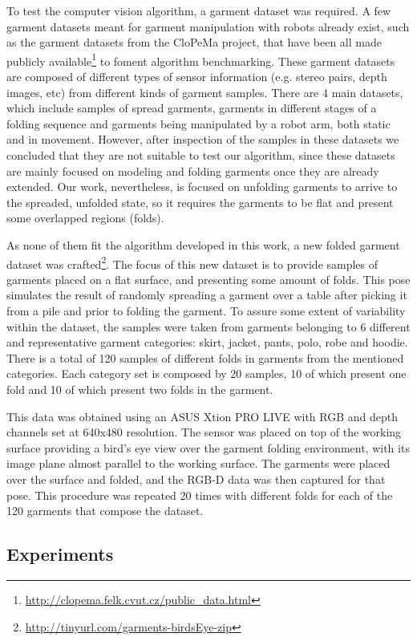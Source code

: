 To test the computer vision algorithm, a garment dataset was required. A few garment datasets meant for garment manipulation with robots already exist, such as the garment datasets from the CloPeMa project, that have been all made publicly available\footnote{\url{http://clopema.felk.cvut.cz/public_data.html}} to foment algorithm benchmarking. These garment datasets are composed of different types of sensor information (e.g. stereo pairs, depth images, etc) from different kinds of garment samples. There are 4 main datasets, which include samples of spread garments, garments in different stages of a folding sequence and garments being manipulated by a robot arm, both static and in movement. However, after inspection of the samples in these datasets we concluded that they are not suitable to test our algorithm, since these datasets are mainly focused on modeling and folding garments once they are already extended. Our work, nevertheless, is focused on unfolding garments to arrive to the spreaded, unfolded state, so it requires the garments to be flat and present some overlapped regions (folds).

As none of them fit the algorithm developed in this work, a new folded garment dataset was crafted\footnote{\url{http://tinyurl.com/garments-birdsEye-zip}}. The focus of this new dataset is to provide samples of garments placed on a flat surface, and presenting some amount of folds. This pose simulates the result of randomly spreading a garment over a table after picking it from a pile and prior to folding the garment.
To assure some extent of variability within the dataset, the samples were taken from garments belonging to 6 different and representative garment categories: skirt, jacket, pants, polo, robe and hoodie. There is a total of 120 samples of different folds in garments from the mentioned categories.  Each category set is composed by 20 samples, 10 of which present one fold and 10 of which present two folds in the garment. 

This data was obtained using an ASUS Xtion PRO LIVE with RGB and depth channels set at 640x480 resolution. The sensor was placed on top of the working surface providing a bird's eye view over the garment folding environment, with its image plane almost parallel to the working surface. The garments were placed over the surface and folded, and the RGB-D data was then captured for that pose. This procedure was repeated 20 times with different folds for each of the 120 garments that compose the dataset.

\subsection{Experiments}
\label{experiments:experiments}

